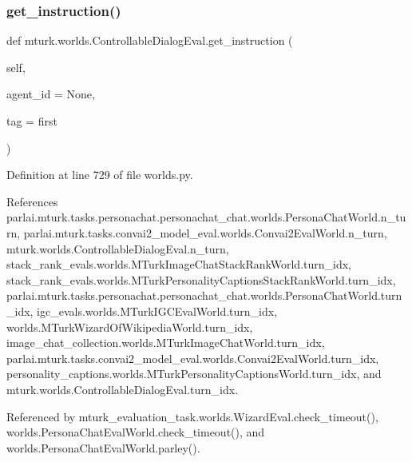 \subsubsection{\texorpdfstring{get\+\_\+instruction()}{get\_instruction()}}
{\footnotesize\ttfamily def mturk.\+worlds.\+Controllable\+Dialog\+Eval.\+get\+\_\+instruction (\begin{DoxyParamCaption}\item[{}]{self,  }\item[{}]{agent\+\_\+id = {\ttfamily None},  }\item[{}]{tag = {\ttfamily \textquotesingle{}first\textquotesingle{}} }\end{DoxyParamCaption})}



Definition at line 729 of file worlds.\+py.



References parlai.\+mturk.\+tasks.\+personachat.\+personachat\+\_\+chat.\+worlds.\+Persona\+Chat\+World.\+n\+\_\+turn, parlai.\+mturk.\+tasks.\+convai2\+\_\+model\+\_\+eval.\+worlds.\+Convai2\+Eval\+World.\+n\+\_\+turn, mturk.\+worlds.\+Controllable\+Dialog\+Eval.\+n\+\_\+turn, stack\+\_\+rank\+\_\+evals.\+worlds.\+M\+Turk\+Image\+Chat\+Stack\+Rank\+World.\+turn\+\_\+idx, stack\+\_\+rank\+\_\+evals.\+worlds.\+M\+Turk\+Personality\+Captions\+Stack\+Rank\+World.\+turn\+\_\+idx, parlai.\+mturk.\+tasks.\+personachat.\+personachat\+\_\+chat.\+worlds.\+Persona\+Chat\+World.\+turn\+\_\+idx, igc\+\_\+evals.\+worlds.\+M\+Turk\+I\+G\+C\+Eval\+World.\+turn\+\_\+idx, worlds.\+M\+Turk\+Wizard\+Of\+Wikipedia\+World.\+turn\+\_\+idx, image\+\_\+chat\+\_\+collection.\+worlds.\+M\+Turk\+Image\+Chat\+World.\+turn\+\_\+idx, parlai.\+mturk.\+tasks.\+convai2\+\_\+model\+\_\+eval.\+worlds.\+Convai2\+Eval\+World.\+turn\+\_\+idx, personality\+\_\+captions.\+worlds.\+M\+Turk\+Personality\+Captions\+World.\+turn\+\_\+idx, and mturk.\+worlds.\+Controllable\+Dialog\+Eval.\+turn\+\_\+idx.



Referenced by mturk\+\_\+evaluation\+\_\+task.\+worlds.\+Wizard\+Eval.\+check\+\_\+timeout(), worlds.\+Persona\+Chat\+Eval\+World.\+check\+\_\+timeout(), and worlds.\+Persona\+Chat\+Eval\+World.\+parley().

